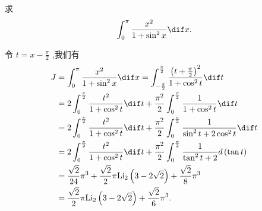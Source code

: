 \documentclass[color=green,titlestyle=hang]{elegantbook}%
\begin{document}
\begin{exercise}
求\[\int_0^{\pi}{\frac{x^2}{1+\sin ^2x}\dif x}.\]
\end{exercise}\begin{Solution}
令 $t=x-\frac{\pi}{2}$ ,我们有
\begin{align*}J&=\int_0^{\pi}{\frac{x^2}{1+\sin ^2x}\dif x}=\int_{-\frac{\pi}{2}}^{\frac{\pi}{2}}{\frac{\left( t+\frac{\pi}{2} \right) ^2}{1+\cos ^2t}\dif t}\\&=2\int_0^{\frac{\pi}{2}}{\frac{t^2}{1+\cos ^2t}\dif t}+\frac{\pi ^2}{2}\int_0^{\frac{\pi}{2}}{\frac{1}{1+\cos ^2t}\dif t}\\&=2\int_0^{\frac{\pi}{2}}{\frac{t^2}{1+\cos ^2t}\dif t}+\frac{\pi ^2}{2}\int_0^{\frac{\pi}{2}}{\frac{1}{\sin ^2t+2\cos ^2t}\dif t}\\&=2\int_0^{\frac{\pi}{2}}{\frac{t^2}{1+\cos ^2t}\dif t}+\frac{\pi ^2}{2}\int_0^{\frac{\pi}{2}}{\frac{1}{\tan ^2t+2}d\left( \tan t \right)}\\&=\frac{\sqrt{2}}{24}\pi ^3+\frac{\sqrt{2}}{2}\pi \mathrm{Li}_2\left( 3-2\sqrt{2} \right) +\frac{\sqrt{2}}{8}\pi ^3\\&=\frac{\sqrt{2}}{2}\pi \mathrm{Li}_2\left( 3-2\sqrt{2} \right) +\frac{\sqrt{2}}{6}\pi ^3.\end{align*}
\end{Solution}
\end{document}
